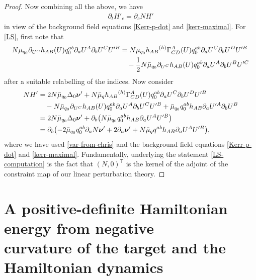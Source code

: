 \documentclass[11pt]{article}
\numberwithin{equation}{section}
\def\ptl{\partial}%
\def\mbo#1{\boldsymbol{#1}}%
\newcommand{\leftexp}[2]{{\vphantom{#2}}^{#1}{#2}}
\def\halb{\frac{1}{2}}%
\numberwithin{equation}{section}
\begin{document}
\begin{proof}
Now combining all the above, we have
\begin{align*}
\ptl_t H'_c = \ptl_c N H'
\end{align*}
in view of the background field equations \eqref{Kerr-p-dot} and \eqref{kerr-maximal}. %
For \eqref{LS}, first note that
\begin{align}
 N \bar{\mu}_{q_0} \ptl_{U^C} h_{AB} (U) q^{ab}_0 \ptl_a U^A \ptl_b U^C U'^B &{}= N \bar{\mu}_{q_0} h_{AB}\leftexp{(h)}{\Gamma}^A_{CD} (U) q^{ab}_0 \ptl_a U^C \ptl_b U^D U'^B \notag\\
 &\quad- \halb N \bar{\mu}_{q_0} \ptl_{U^C} h_{AB}(U) q^{ab}_0 \ptl_a U^A \ptl_b U^B U'^C\label{var-from-chris}
\end{align}
after a suitable relabelling of the indices. Now consider
\begin{align} \label{LS-computation}
N H' &{}= 2N \bar{\mu}_{q_0} \Delta_0 \mbo{\nu}' + N \bar{\mu}_q h_{AB}\leftexp{(h)}{\Gamma}^A_{CD} (U) q^{ab}_0 \ptl_a U^C \ptl_b U^D U'^B \notag\\
&\quad{}- N \bar{\mu}_{q_0} \ptl_{U^C} h_{AB} (U) q^{ab}_0 \ptl_a U^A \ptl_b U^C U'^B + \bar{\mu}_{q_0} q^{ab}_0 h_{AB} \ptl_a U'^A \ptl_b U^B \notag\\
&{}= 2N \bar{\mu}_{q_0} \Delta_0 \mbo{\nu}'+ \ptl_b \bigl(N \bar{\mu}_{q_0} q_0^{ab}h_{AB} \ptl_a U^A U'^B\bigr) \notag\\
&{}= \ptl_b \bigl(-2 \bar{\mu}_{q_0} q_0^{ab} \ptl_a N \mbo{\nu}' + 2 \ptl_a \mbo{\nu}' + N \bar{\mu}_q q^{ab} h_{AB} \ptl_a U^A U'^B\bigr),
\end{align}
where we have used \eqref{var-from-chris} and the background field equations \eqref{Kerr-p-dot} and \eqref{kerr-maximal}.
Fundamentally, underlying the statement \eqref{LS-computation} is the fact that $(N, 0)^{\mathsf{T}}$ is the kernel of the adjoint of the constraint map of our linear perturbation theory.
\end{proof}

\section[A positive-definite Hamiltonian energy from negative curvature of the target\\ and~the~Hamiltonian dynamics]{A positive-definite Hamiltonian energy from negative\\ curvature of the target and the Hamiltonian dynamics}\label{section4}
\end{document}
